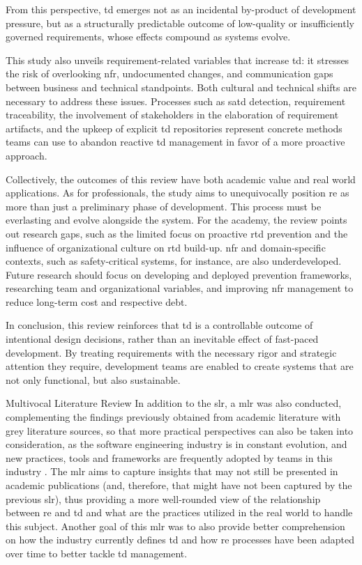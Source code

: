 \documentclass[12pt,reqno, twoside]{amsbook}
\makeatletter
\def\section{\@startsection{section}{1}%
      \z@{.5\linespacing\@plus.7\linespacing}{.25\linespacing}%
      {\normalfont\bfseries\flushleft}}
\theoremstyle{plain}
\numberwithin{equation}{chapter}
\numberwithin{section}{chapter}
\makeatother
\begin{document}
From this perspective, \gls{td} emerges not as an incidental by-product of development pressure, but as a structurally predictable outcome of low-quality or insufficiently 
governed requirements, whose effects compound as systems evolve.

This study also unveils requirement-related variables that increase \gls{td}: it stresses the risk of overlooking \gls{nfr}, undocumented changes, and communication gaps between business and technical standpoints. Both cultural and technical shifts are necessary to address these issues. Processes such as \gls{satd} detection, requirement traceability, the involvement of stakeholders in the elaboration of requirement artifacts, and the upkeep of explicit \gls{td} repositories represent concrete methods teams can use to abandon reactive \gls{td} management in favor of a more proactive approach.

Collectively, the outcomes of this review have both academic value and real world applications. As for professionals, the study aims to unequivocally position \gls{re} as more than just a preliminary phase of development. This process must be everlasting and evolve alongside the system. For the academy, the review points out research gaps, such as the limited focus on proactive \gls{rtd} prevention and the influence of organizational culture on \gls{rtd} build-up. \gls{nfr} and domain-specific contexts, such as safety-critical systems, for instance, are also underdeveloped. Future research should focus on developing and deployed prevention frameworks, researching team and organizational variables, and improving \gls{nfr} management to reduce long-term cost and respective debt.

In conclusion, this review reinforces that \gls{td} is a controllable outcome of intentional design decisions, rather than an inevitable effect of fast-paced development. By treating requirements with the necessary rigor and strategic attention they require, development teams are enabled to create systems that are not only functional, but also sustainable.

\section{Multivocal Literature Review}
\noindent In addition to the \gls{slr}, a \gls{mlr} was also conducted, complementing the findings previously obtained from 
academic literature with grey literature sources, so that more practical perspectives can also be taken into consideration, as the 
software engineering industry is in constant evolution, and new practices, tools and frameworks are frequently adopted by teams in 
this industry \parencite{Garousi2019}. The \gls{mlr} aims to capture insights that may not still be presented in academic 
publications (and, therefore, that might have not been captured by the previous \gls{slr}), thus providing a more well-rounded view 
of the relationship between \gls{re} and \gls{td} and what are the practices utilized in the real world to handle this subject. 
Another goal of this \gls{mlr} was to also provide better comprehension on how the industry currently defines \gls{td} and how \gls{re} 
processes have been adapted over time to better tackle \gls{td} management. 
\end{document}
